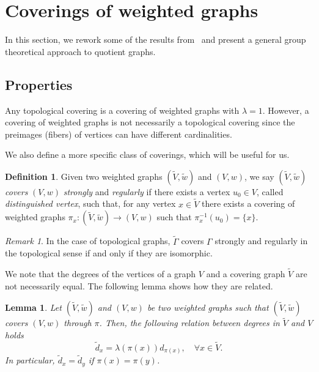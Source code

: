 \documentclass[11pt]{amsart}
\theoremstyle{definition}
\newtheorem{definition}{Definition}
\theoremstyle{remark}
\newtheorem{remark}{Remark}
\theoremstyle{plain}
\newtheorem{lemma}{Lemma}
\numberwithin{equation}{section}
\numberwithin{lemma}{section}
\numberwithin{definition}{section}
\numberwithin{proposition}{section}
\numberwithin{corollary}{section}
\numberwithin{theorem}{section}
\numberwithin{remark}{section}
\begin{document}
\section{Coverings of weighted graphs}\label{sec3}
In this section, we rework some of the results from~\cite{MR1667452} and present a general group theoretical approach to quotient graphs.
\subsection{Properties}

Any topological covering is a covering of weighted graphs with $\lambda=1$. However, a covering of weighted graphs is not necessarily a topological covering since the preimages (fibers) of vertices can have different cardinalities.

We also define a more specific class of coverings, which will be useful for us.

\begin{definition}
Given two weighted graphs $(\tilde{V},\tilde{w})$ and $(V,w)$, we say $(\tilde{V},\tilde{w})$ \textit{covers} $(V,w)$ \textit{strongly} and \textit{regularly} if there exists a vertex $u_0\in V$, called \textit{distinguished vertex}, such that, for any vertex $x\in \tilde{V}$ there exists a covering of weighted graphs $\pi_x \colon (\tilde{V},\tilde{w})\to (V,w)$ such that $\pi_x^{-1}(u_0)=\{x\}$.
\end{definition}

\begin{remark}
In the case of topological graphs, $\tilde{\Gamma}$ covers $\Gamma$ strongly and regularly in the topological sense if and only if they are isomorphic. 
\end{remark}

We note that the degrees of the vertices of a graph $V$ and a covering graph $\tilde V$ are not necessarily equal. The following lemma shows how they are related.

\begin{lemma}
 Let $(\tilde{V},\tilde{w})$ and $(V,w)$ be two weighted graphs such that $(\tilde{V},\tilde{w})$ covers $(V,w)$ through $\pi$.
 Then, the following relation between degrees in $\tilde{V}$ and $V$ holds
 \begin{equation}\label{new_degree}
 \tilde{d}_x=\lambda(\pi(x))d_{\pi(x)}, \quad\forall x\in \tilde{V}.
 \end{equation}
 In particular, $\tilde{d}_x=\tilde{d}_y$ if $\pi(x)=\pi(y)$.
\end{lemma}
\end{document}
